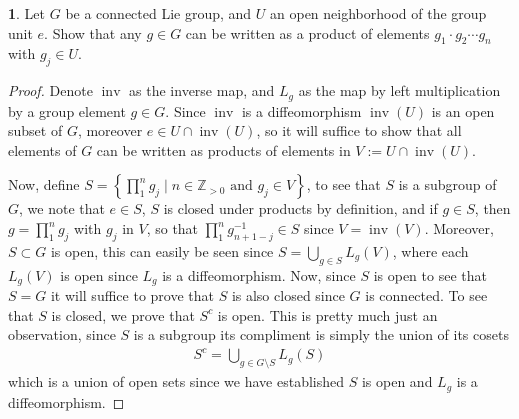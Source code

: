 \documentclass[10.5pt]{article}
\theoremstyle{definition}
\newtheorem{pb}{}
\newcommand{\set}[1]{\left\{#1\right\}}
\newcommand{\tand}{\text{ and }}
\newcommand{\inv}{\operatorname{inv}}
\begin{document}
    \begin{pb}
        Let \(G\) be a connected Lie group, and \(U\) an open neighborhood of the group unit \(e\). Show that any \(g \in G\) can be written as a product of elements \(g_1\cdot g_2\cdots g_n\) with \(g_j \in U\).
    \begin{proof}
        Denote \(\inv\) as the inverse map, and \(L_g\) as the map by left multiplication by a group element \(g \in G\). Since \(\inv\) is a diffeomorphism \(\inv(U)\) is an open subset of \(G\), moreover \(e \in U \cap \inv(U)\), so it will suffice to show that all elements of \(G\) can be written as products of elements in \(V := U \cap \inv(U)\).

        Now, define \(S = \set{\prod_1^n g_j \mid n \in \mathbb{Z}_{>0} \tand g_j \in V}\), to see that \(S\) is a subgroup of \(G\), we note that \(e \in S\), \(S\) is closed under products by definition, and if \(g \in S\), then \(g = \prod_1^n g_j\) with \(g_j\) in \(V\), so that \(\prod_{1}^n g_{n+1 - j}^{-1} \in S\) since \(V = \inv(V)\). Moreover, \(S \subset G\) is open, this can easily be seen since \(S = \bigcup_{g \in S} L_g(V)\), where each \(L_g(V)\) is open since \(L_g\) is a diffeomorphism. Now, since \(S\) is open to see that \(S = G\) it will suffice to prove that \(S\) is also closed since \(G\) is connected. To see that \(S\) is closed, we prove that \(S^c\) is open. This is pretty much just an observation, since \(S\) is a subgroup its compliment is simply the union of its cosets
        \begin{align*}
            S^c = \bigcup_{g \in G \setminus S}L_g(S)
        \end{align*}
        which is a union of open sets since we have established \(S\) is open and \(L_g\) is a diffeomorphism.
    \end{proof}
    \end{pb}
\end{document}
